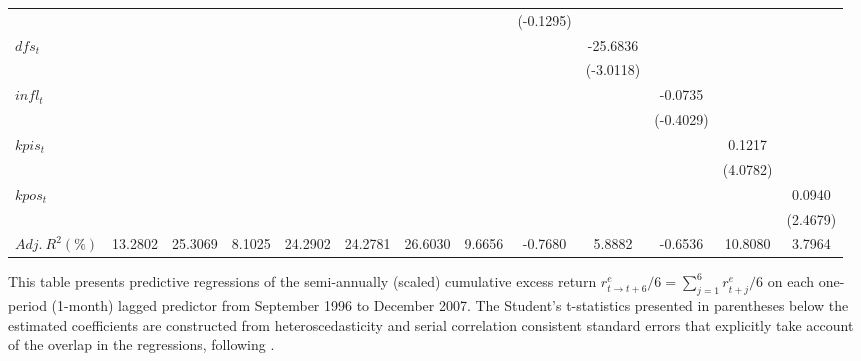\documentclass[11pt]{article}
\begin{document}
{\begin{sidewaystable}
\begin{center}
{\begin{tabular}{lcccccccccccc}
&&&&&&&&(-0.1295)&&&&\\
$dfs_t$&&&&&&&&&-25.6836&&&\\
&&&&&&&&&(-3.0118)&&&\\
$infl_t$&&&&&&&&&&-0.0735&&\\
&&&&&&&&&&(-0.4029)&&\\
$kpis_t$&&&&&&&&&&&0.1217&\\
&&&&&&&&&&&(4.0782)&\\
$kpos_t$&&&&&&&&&&&&0.0940\\
&&&&&&&&&&&&(2.4679)\\
$Adj.\ R^2 (\%)$&13.2802&25.3069&8.1025&24.2902&24.2781&26.6030&9.6656&-0.7680&5.8882&-0.6536&10.8080&3.7964\\ \hline

\end{tabular}
}
\end{center}
\noindent \tiny This table presents predictive regressions of the semi-annually (scaled) cumulative excess return $r_{t\rightarrow t+6}^e/6=\sum^6_{j=1}r_{t+j}^e/6$ on each one-period (1-month) lagged predictor from September 1996 to December 2007. The Student's t-statistics presented in parentheses below the estimated coefficients are constructed from heteroscedasticity and serial correlation consistent standard errors that explicitly take account of the overlap in the regressions, following \cite{Hodrick92RFS}.
\end{sidewaystable}
}



\newpage
\end{document}
